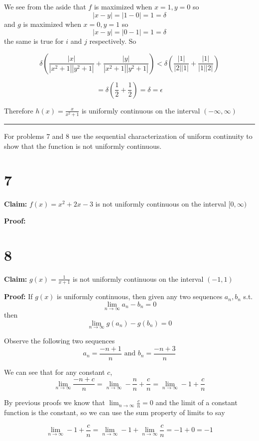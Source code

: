 \documentclass[10pt,letterpaper]{article}
\newcommand\ds{\displaystyle}
\newcommand\qedsym{\hfill \rule{2mm}{2mm}}
\begin{document}
We see from the aside that $f$ is maximized when $x=1, y=0$ so
\[|x-y| = |1-0| = 1 = \delta\]
and $g$ is maximized when $x=0,y=1$ so
\[|x-y| = |0-1| = 1 = \delta\]
the same is true for $i$ and $j$ respectively. So

\[\delta\left(\frac{|x|}{|x^2+1||y^2+1|}+\frac{|y|}{|x^2+1||y^2+1|}\right) < \delta\left(\frac{|1|}{|2||1|}+\frac{|1|}{|1||2|}\right)\]

\[=\delta\left(\frac{1}{2} + \frac{1}{2}\right) = \delta = \epsilon\]

Therefore $h(x) = \frac{x}{x^2+1}$ is uniformly continuous on the interval $(-\infty, \infty)$

\qedsym

\bigskip

For problems 7 and 8 use the sequential characterization of uniform continuity to show that the function is not uniformly continuous.

\section*{7}

\textbf{Claim:} $f(x) = x^2+2x-3$ is not uniformly continuous on the interval $[0, \infty)$

\medskip

\textbf{Proof:} 

\section*{8}

\textbf{Claim:} $g(x) = \frac{1}{x+1}$ is not uniformly continuous on the interval $(-1, 1)$

\medskip

\textbf{Proof:} If $g(x)$ is uniformly continuous, then given any two sequences $a_n, b_n$ s.t. \[\ds\lim_{n\to\infty}a_n-b_n = 0\] then \[\ds\lim_{n\to\infty}g(a_n)-g(b_n) = 0\]

Observe the following two sequences 
\[a_n = \frac{-n+1}{n} \text{ and } b_n = \frac{-n+3}{n}\]

We can see that for any constant $c$,
\[\lim_{n\to\infty}\frac{-n+c}{n} = \lim_{n\to\infty}-\frac{n}{n} + \frac{c}{n}=\lim_{n\to\infty}-1 + \frac{c}{n}\]

By previous proofs we know that $\ds\lim_{n\to\infty}\frac{c}{n} = 0$ and the limit of a constant function is the constant, so we can use the sum property of limits to say

\[\lim_{n\to\infty}-1 + \frac{c}{n} = \lim_{n\to\infty}-1 + \lim_{n\to\infty}\frac{c}{n}=-1+0=-1\]
\end{document}
